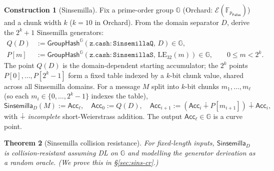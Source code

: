 \documentclass[11pt,a4paper]{article}
\newtheorem{theorem}{Theorem}[section]
\theoremstyle{definition}
\newtheorem{construction}[theorem]{Construction}
\newcommand{\F}{\mathbb{F}}
\newcommand{\G}{\mathbb{G}}
\newcommand{\Pallas}{\ensuremath{\mathsf{Pallas}}}
\newcommand{\Ep}{\ensuremath{\mathcal{E}}}
\newcommand{\Sinsemilla}{\ensuremath{\mathsf{Sinsemilla}}}
\newcommand{\Acc}{\ensuremath{\mathsf{Acc}}}
\newcommand{\GroupHash}{\ensuremath{\mathsf{GroupHash}}}
\begin{document}
\begin{construction}[Sinsemilla]\label{const:sinsemilla}
Fix a prime-order group $\G$ (Orchard: $\Ep(\F_{p_{\Pallas}})$) and a
chunk width $k$ ($k = 10$ in Orchard).
From the domain separator $D$, derive the $2^k + 1$ Sinsemilla generators:
\begin{align*}
Q(D) &:= \GroupHash^{\G}(\mathtt{z.cash:SinsemillaQ},\, D) \in \G, \\
P[m] &:= \GroupHash^{\G}(\mathtt{z.cash:SinsemillaS},\, \mathrm{LE}_{32}(m)) \in \G, \qquad 0 \le m < 2^k.
\end{align*}
The point $Q(D)$ is the domain-dependent starting accumulator; the
$2^k$ points $P[0], \dots, P[2^k-1]$ form a fixed table indexed by a
$k$-bit chunk value, shared across all Sinsemilla domains. For a message
$M$ split into $k$-bit chunks $m_1, \dots,
m_\ell$ (so each $m_i \in \{0, \dots, 2^k - 1\}$ indexes the table),
\[
\Sinsemilla_D(M) := \Acc_\ell, \quad \Acc_0 := Q(D), \quad \Acc_{i+1} := (\Acc_i \dotplus P[m_{i+1}]) \dotplus \Acc_i,
\]
with $\dotplus$ \emph{incomplete} short-Weierstrass addition. The output
$\Acc_\ell \in \G$ is a curve point.
\end{construction}

\begin{theorem}[Sinsemilla collision resistance]\label{thm:sinsemilla-cr}
For fixed-length inputs, $\Sinsemilla_D$ is collision-resistant assuming
DL on $\G$ and modelling the generator derivation as a random oracle.
(We prove this in \S\ref{sec:sins-cr}.)
\end{theorem}
\end{document}
